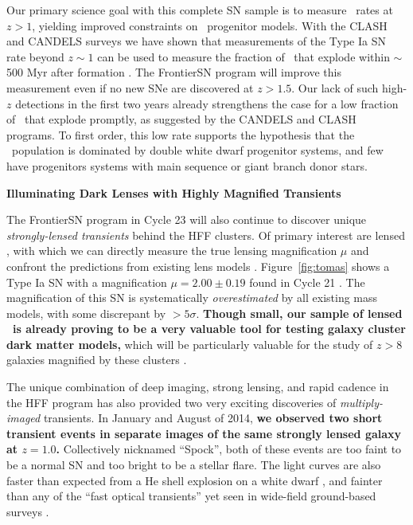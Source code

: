 \documentclass[12pt]{article}
\begin{document}
Our primary science goal with this complete SN sample is to measure
\SNIa\ rates at $z>1$, yielding improved constraints on
\SNIa\ progenitor models.  With the CLASH and CANDELS surveys we have
shown that measurements of the Type Ia SN rate beyond $z\sim1$ can be
used to measure the fraction of \SNeIa\ that explode within $\sim$500
Myr after formation \citep{Graur:2014,Rodney:2014}.  The FrontierSN
program will improve this measurement even if no new SNe are
discovered at $z>1.5$.  Our lack of such high-$z$ detections in the
first two years already strengthens the case for a low fraction of
\SNeIa\ that explode promptly, as suggested by the CANDELS and CLASH
programs.  To first order, this low rate supports the hypothesis that
the \SNIa\ population is dominated by double white dwarf progenitor
systems, and few have progenitors systems with main sequence or
giant branch donor stars.


\centerline {\bf Illuminating Dark Lenses with Highly Magnified Transients} 
\medskip

The FrontierSN program in Cycle 23 will also continue to discover
unique {\it strongly-lensed transients} behind the HFF clusters. Of
primary interest are lensed \SNeIa, with which we can directly
measure the true lensing magnification $\mu$ and confront the
predictions from existing lens models
\citep{Riehm:2011,Patel:2014,Nordin:2014}.  Figure~\ref{fig:tomas}
shows a Type Ia SN with a magnification
$\mu=2.00\pm0.19$ found in Cycle 21 \citep{Rodney:2015b}.  The
magnification of this SN is systematically {\it overestimated} by all
existing mass models, with some discrepant by $>5\sigma$.
{\bf Though small, our sample of lensed \SNeIa\ is already proving to be
  a very valuable tool for testing galaxy cluster dark matter models,}
which will be particularly valuable for the study of $z>8$ galaxies
magnified by these clusters
\citep[e.g.][]{Zheng:2012,Coe:2013,Bouwens:2014,Zitrin:2014}.

The unique combination of deep imaging, strong lensing, and rapid
cadence in the HFF program has also provided two very
exciting discoveries of {\it multiply-imaged} transients.  In January
and August of 2014, {\bf we observed two short transient events in
  separate images of the same strongly lensed galaxy at $z=1.0$.}
Collectively nicknamed ``Spock'', both of these events are too faint
to be a normal SN and too bright to be a stellar flare.  The light
curves are also faster than expected from a He shell explosion on a
white dwarf \citep[a ``.Ia'' event][]{Bildsten:2007,Shen:2010}, and
fainter than any of the ``fast optical transients'' yet seen in
wide-field ground-based surveys
\citep[e.g.][]{Kasliwal:2010,Poznanski:2010,Ofek:2010,Drout:2014,Vinko:2015}.
\end{document}
